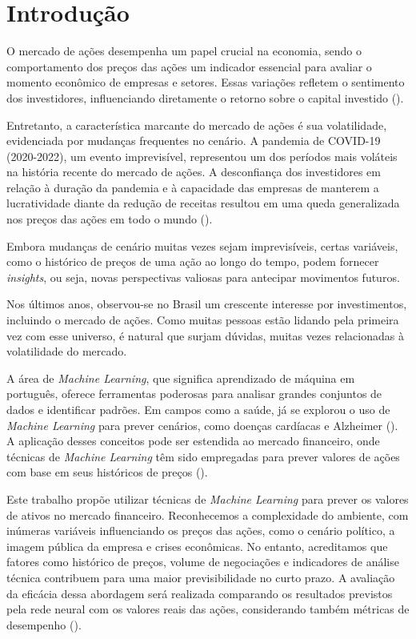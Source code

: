 \chapter{Introdução}
\label{ch:introducao}

O mercado de ações desempenha um papel crucial na economia, sendo o comportamento dos preços das ações um indicador essencial para avaliar o momento econômico de empresas e setores. Essas variações refletem o sentimento dos investidores, influenciando diretamente o retorno sobre o capital investido (\cite{Smales2017}).

Entretanto, a característica marcante do mercado de ações é sua volatilidade, evidenciada por mudanças frequentes no cenário. A pandemia de COVID-19 (2020-2022), um evento imprevisível, representou um dos períodos mais voláteis na história recente do mercado de ações. A desconfiança dos investidores em relação à duração da pandemia e à capacidade das empresas de manterem a lucratividade diante da redução de receitas resultou em uma queda generalizada nos preços das ações em todo o mundo (\cite{Wang2021}).

Embora mudanças de cenário muitas vezes sejam imprevisíveis, certas variáveis, como o histórico de preços de uma ação ao longo do tempo, podem fornecer \textit{insights}, ou seja, novas perspectivas valiosas para antecipar movimentos futuros.

Nos últimos anos, observou-se no Brasil um crescente interesse por investimentos, incluindo o mercado de ações. Como muitas pessoas estão lidando pela primeira vez com esse universo, é natural que surjam dúvidas, muitas vezes relacionadas à volatilidade do mercado.

A área de \textit{Machine Learning}, que significa aprendizado de máquina em português, oferece ferramentas poderosas para analisar grandes conjuntos de dados e identificar padrões. Em campos como a saúde, já se explorou o uso de \textit{Machine Learning} para prever cenários, como doenças cardíacas e Alzheimer (\cite{Alotaibi2019, Antor2019}). A aplicação desses conceitos pode ser estendida ao mercado financeiro, onde técnicas de \textit{Machine Learning} têm sido empregadas para prever valores de ações com base em seus históricos de preços (\cite{Vijh2020}).

Este trabalho propõe utilizar técnicas de \textit{Machine Learning} para prever os valores de ativos no mercado financeiro. Reconhecemos a complexidade do ambiente, com inúmeras variáveis influenciando os preços das ações, como o cenário político, a imagem pública da empresa e crises econômicas. No entanto, acreditamos que fatores como histórico de preços, volume de negociações e indicadores de análise técnica contribuem para uma maior previsibilidade no curto prazo. A avaliação da eficácia dessa abordagem será realizada comparando os resultados previstos pela rede neural com os valores reais das ações, considerando também métricas de desempenho (\cite{Patel2015}).

